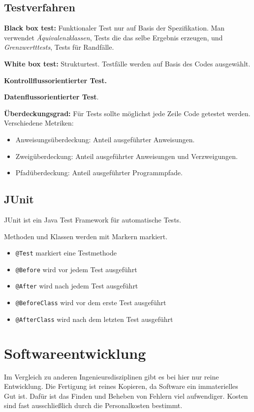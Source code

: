 \documentclass{panikzettel}
\begin{document}
\subsection{Testverfahren}

\textbf{Black box test:} Funktionaler Test nur auf Basis der Spezifikation. Man verwendet \emph{Äquivalenzklassen}, Tests die das selbe Ergebnis erzeugen, und \emph{Grenzwertttests}, Tests für Randfälle.

\textbf{White box test:} Strukturtest. Testfälle werden auf Basis des Codes ausgewählt.

\textbf{Kontrollflussorientierter Test.}

\textbf{Datenflussorientierter Test}.

\textbf{Überdeckungsgrad:} Für Tests sollte möglichst jede Zeile Code getestet werden. Verschiedene Metriken: \begin{itemize}
\item Anweisungsüberdeckung: Anteil ausgeführter Anweisungen.
\item Zweigüberdeckung: Anteil ausgeführter Anweisungen und Verzweigungen.
\item Pfadüberdeckung: Anteil ausgeführter Programmpfade.
\end{itemize}

\subsection{JUnit}

JUnit ist ein Java Test Framework für automatische Tests.

Methoden und Klassen werden mit Markern markiert.
\begin{itemize}
\item \lstinline{@Test} markiert eine Testmethode
\item \lstinline{@Before} wird vor jedem Test ausgeführt
\item \lstinline{@After} wird nach jedem Test ausgeführt
\item \lstinline{@BeforeClass} wird vor dem erste Test ausgeführt
\item \lstinline{@AfterClass} wird nach dem letzten Test ausgeführt
\end{itemize}

\section{Softwareentwicklung}
Im Vergleich zu anderen Ingenieursdisziplinen gibt es bei hier nur reine Entwicklung. Die Fertigung ist reines Kopieren, da Software ein immaterielles Gut ist. Dafür ist das Finden und Beheben von Fehlern viel aufwendiger. Kosten sind fast ausschließlich durch die Personalkosten bestimmt.
\end{document}
